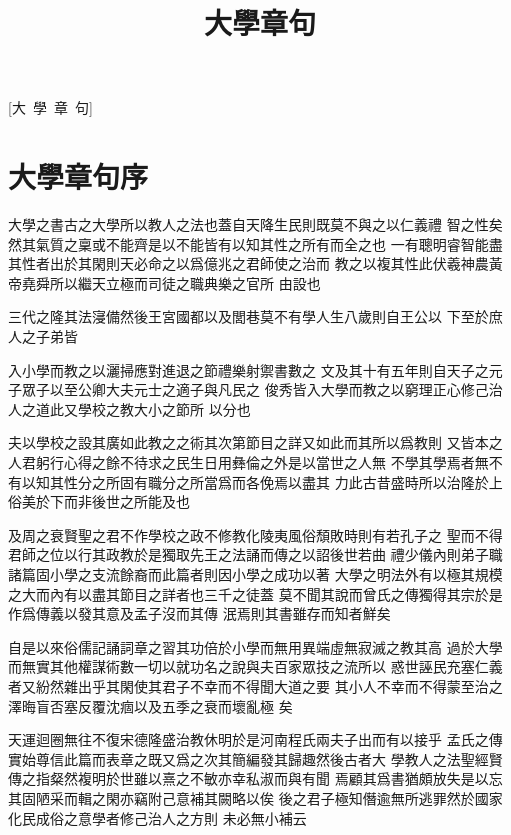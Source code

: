 \documentclass{zhvt-classic}
\title{大學章句}
\begin{document}
[大~學~章~句]

\cleardoublepage

\setcounter{page}{1}
\tableofcontents

\mainmatter

\chapter*{大學章句序}

大學之書古之大學所以教人之法也蓋自天降生民則既莫不與之以仁義禮
智之性矣然其氣質之稟或不能齊是以不能皆有以知其性之所有而全之也
一有聰明睿智能盡其性者出於其閑則天必命之以爲億兆之君師使之治而
教之以複其性此伏羲神農黃帝堯舜所以繼天立極而司徒之職典樂之官所
由設也

三代之隆其法寖備然後王宮國都以及閭巷莫不有學人生八歲則自王公以
下至於庶人之子弟皆

入小學而教之以灑掃應對進退之節禮樂射禦書數之
文及其十有五年則自天子之元子眾子以至公卿大夫元士之適子與凡民之
俊秀皆入大學而教之以窮理正心修己治人之道此又學校之教大小之節所
以分也

夫以學校之設其廣如此教之之術其次第節目之詳又如此而其所以爲教則
又皆本之人君躬行心得之餘不待求之民生日用彝倫之外是以當世之人無
不學其學焉者無不有以知其性分之所固有職分之所當爲而各俛焉以盡其
力此古昔盛時所以治隆於上俗美於下而非後世之所能及也

及周之衰賢聖之君不作學校之政不修教化陵夷風俗頹敗時則有若孔子之
聖而不得君師之位以行其政教於是獨取先王之法誦而傳之以詔後世若曲
禮少儀內則弟子職諸篇固小學之支流餘裔而此篇者則因小學之成功以著
大學之明法外有以極其規模之大而內有以盡其節目之詳者也三千之徒蓋
莫不聞其說而曾氏之傳獨得其宗於是作爲傳義以發其意及孟子沒而其傳
泯焉則其書雖存而知者鮮矣

自是以來俗儒記誦詞章之習其功倍於小學而無用異端虛無寂滅之教其高
過於大學而無實其他權謀術數一切以就功名之說與夫百家眾技之流所以
惑世誣民充塞仁義者又紛然雜出乎其閑使其君子不幸而不得聞大道之要
其小人不幸而不得蒙至治之澤晦盲否塞反覆沈痼以及五季之衰而壞亂極
矣

天運迴圈無往不復宋德隆盛治教休明於是河南程氏兩夫子出而有以接乎
孟氏之傳實始尊信此篇而表章之既又爲之次其簡編發其歸趣然後古者大
學教人之法聖經賢傳之指粲然複明於世雖以熹之不敏亦幸私淑而與有聞
焉顧其爲書猶頗放失是以忘其固陋采而輯之閑亦竊附己意補其闕略以俟
後之君子極知僭逾無所逃罪然於國家化民成俗之意學者修己治人之方則
未必無小補云
\end{document}
